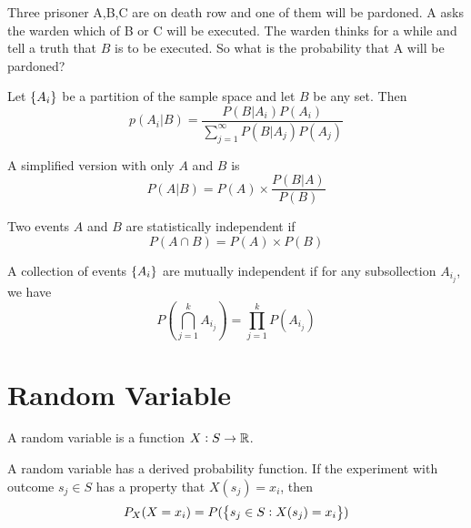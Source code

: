 \begin{example}[3 choose 1]
    Three prisoner A,B,C are on death row and one of them will be pardoned. A asks the warden which of B or C will be executed. The warden thinks for a while and tell a truth that $B$ is to be executed. So what is the probability that A will be pardoned?
\end{example}

\begin{theorem}
    Let $\set{A_i}$ be a partition of the sample space and let $B$ be any set. Then
    \begin{equation}
        p(A_i|B) = \frac{P(B|A_i)P(A_i)}{\displaystyle \sum_{j=1}^\infty P(B|A_j)P(A_j)}
    \end{equation}
    
    A simplified version with only $A$ and $B$ is
    \begin{equation}
        P(A|B) = P(A) \times \frac{P(B|A)}{P(B)}
    \end{equation}
\end{theorem}

\begin{definition}
    Two events $A$ and $B$ are statistically independent if
    \begin{equation}
        P(A \cap B) = P(A) \times P(B)
    \end{equation}
\end{definition}

\begin{definition}
    A collection of events $\set{A_i}$ are mutually independent if for any subsollection $A_{i_j}$, we have
    \begin{equation}
        P\left( \bigcap_{j=1}^k A_{i_j} \right) = \prod_{j=1}^k P(A_{i_j})
    \end{equation}
\end{definition}



\section{Random Variable}


\begin{definition}
    A random variable is a function $X: S \rightarrow \mathbb{R}$. 
\end{definition}

A random variable has a derived probability function. If the experiment with outcome $s_j \in S$ has a property that $X(s_j) = x_i$, then
\begin{equation}
    P_X(X=x_i) = P(\set{s_j \in S: X(s_j) = x_i})
\end{equation}

